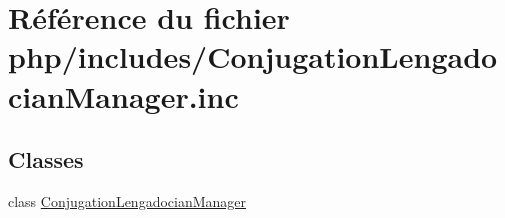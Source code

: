 \hypertarget{_conjugation_lengadocian_manager_8inc}{}\section{Référence du fichier php/includes/\+Conjugation\+Lengadocian\+Manager.inc}
\label{_conjugation_lengadocian_manager_8inc}
\subsection*{Classes}
\begin{DoxyCompactItemize}
\item 
class \hyperlink{class_conjugation_lengadocian_manager}{Conjugation\+Lengadocian\+Manager}
\end{DoxyCompactItemize}
